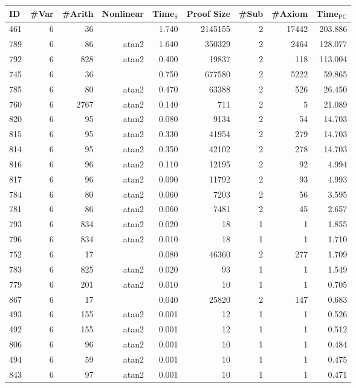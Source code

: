 \begin{table}
  \begin{center}
\begin{tabular}{l|r|r|r|r|r|r|r|r}
ID & \#Var & \#Arith & Nonlinear & Time$_{\text{S}}$ & Proof Size & \#Sub & \#Axiom & Time$_{\text{PC}}$ \\
\hline
461 & 6 & 36 &  & 1.740 & 2145155 & 2 & 17442 & 203.886 \\
789 & 6 & 86 & atan2 & 1.640 & 350329 & 2 & 2464 & 128.077 \\
792 & 6 & 828 & atan2 & 0.400 & 19837 & 2 & 118 & 113.004 \\
745 & 6 & 36 &  & 0.750 & 677580 & 2 & 5222 & 59.865 \\
785 & 6 & 80 & atan2 & 0.470 & 63388 & 2 & 526 & 26.450 \\
760 & 6 & 2767 & atan2 & 0.140 & 711 & 2 & 5 & 21.089 \\
820 & 6 & 95 & atan2 & 0.080 & 9134 & 2 & 54 & 14.703 \\
815 & 6 & 95 & atan2 & 0.330 & 41954 & 2 & 279 & 14.703 \\
814 & 6 & 95 & atan2 & 0.350 & 42102 & 2 & 278 & 14.703 \\
816 & 6 & 96 & atan2 & 0.110 & 12195 & 2 & 92 & 4.994 \\
817 & 6 & 96 & atan2 & 0.090 & 11792 & 2 & 93 & 4.993 \\
784 & 6 & 80 & atan2 & 0.060 & 7203 & 2 & 56 & 3.595 \\
781 & 6 & 86 & atan2 & 0.060 & 7481 & 2 & 45 & 2.657 \\
793 & 6 & 834 & atan2 & 0.020 & 18 & 1 & 1 & 1.855 \\
796 & 6 & 834 & atan2 & 0.010 & 18 & 1 & 1 & 1.710 \\
752 & 6 & 17 &  & 0.080 & 46360 & 2 & 277 & 1.709 \\
783 & 6 & 825 & atan2 & 0.020 & 93 & 1 & 1 & 1.549 \\
779 & 6 & 201 & atan2 & 0.010 & 10 & 1 & 1 & 0.705 \\
867 & 6 & 17 &  & 0.040 & 25820 & 2 & 147 & 0.683 \\
493 & 6 & 155 & atan2 & 0.001 & 12 & 1 & 1 & 0.526 \\
492 & 6 & 155 & atan2 & 0.001 & 12 & 1 & 1 & 0.512 \\
806 & 6 & 96 & atan2 & 0.001 & 10 & 1 & 1 & 0.484 \\
494 & 6 & 59 & atan2 & 0.001 & 10 & 1 & 1 & 0.475 \\
843 & 6 & 97 & atan2 & 0.001 & 10 & 1 & 1 & 0.471 \\

\end{tabular}
\end{center}
\end{table}
